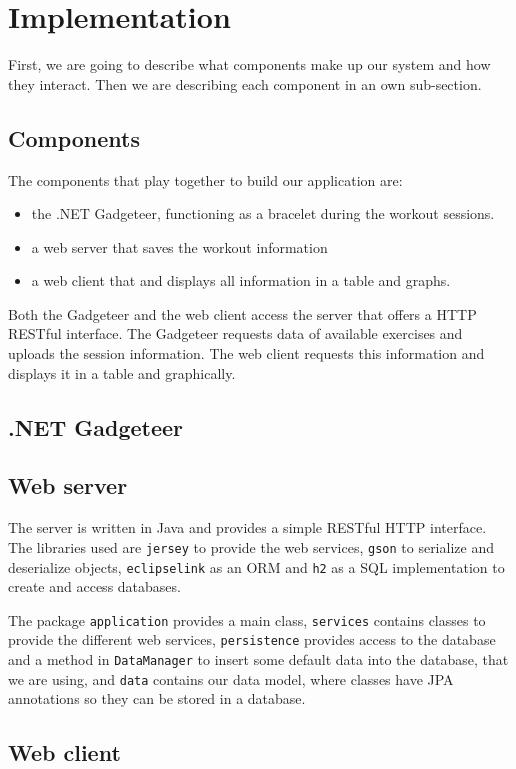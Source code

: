 \documentclass{tk3-team}
\begin{document}
\section{Implementation}

First, we are going to describe what components make up our system and how they interact. Then we are describing each component in an own sub-section.

\subsection{Components}
The components that play together to build our application are:
\begin{itemize}
	\item the .NET Gadgeteer, functioning as a bracelet during the workout sessions.
	\item a web server that saves the workout information 
	\item  a web client that and displays all information in a table and graphs.
\end{itemize}

Both the Gadgeteer and the web client access the server that offers a HTTP RESTful interface. The Gadgeteer requests data of available exercises  and uploads the session information. The web client requests this information and displays it in a table and graphically.

\subsection{.NET Gadgeteer}
\subsection{Web server}

The server is written in Java and provides a simple RESTful HTTP interface. The libraries used are \texttt{jersey} to provide the web services, \texttt{gson} to serialize and deserialize objects, \texttt{eclipselink} as an ORM and \texttt{h2} as a SQL implementation to create and access databases.

The package \texttt{application} provides a main class, \texttt{services} contains classes to provide the different web services, \texttt{persistence} provides access to the database and a method in \texttt{DataManager} to insert some default data into the database, that we are using, and \texttt{data} contains our data model, where classes have JPA annotations so they can be stored in a database.


\subsection{Web client}
\end{document}
